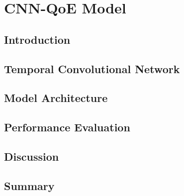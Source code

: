 \chapter{CNN-QoE Model}
\label{ch:CNN}


\renewcommand{\SectionsDir}{Chapter4/Sections}
\renewcommand{\FigsDir}{Chapter4/Figs}
\renewcommand{\TablesDir}{Chapter4/Tables}


\section{Introduction}
\label{CNN:sec:Introduction}


\section{Temporal Convolutional Network}
\label{CNN:sec:TCN}


\section{Model Architecture}
\label{CNN:sec:Proposals}


\section{Performance Evaluation}
\label{CNN:sec:Evaluation}


\section{Discussion}
\label{CNN:sec:Discussion}


\section{Summary}
\label{CNN:sec:Summary}

